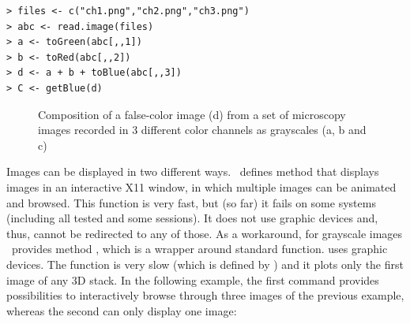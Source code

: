 \begin{verbatim}
> files <- c("ch1.png","ch2.png","ch3.png")
> abc <- read.image(files)
> a <- toGreen(abc[,,1])
> b <- toRed(abc[,,2])
> d <- a + b + toBlue(abc[,,3])
> C <- getBlue(d)
\end{verbatim}

\begin{figure}
\vspace*{.1in}
\begin{center}
\end{center}
\caption{\label{figure:channels}
    Composition of a false-color image (d) from a set of microscopy images recorded in 3 different color channels as grayscales (a, b and c)
}
\end{figure}

Images can be displayed in two different ways. \EBImage\ defines method  that displays images in an interactive X11 window, in which multiple images can be animated and browsed. This function is very fast, but (so far) it fails on some systems (including all tested  and some  sessions). It does not use \R{} graphic devices and, thus, cannot be redirected to any of those. As a workaround, for grayscale images \EBImage\ provides method , which is a wrapper around standard \R{}  function.  uses \R{} graphic devices. The function is very slow (which is defined by ) and it plots only the first image of any 3D stack. In the following example, the first command provides possibilities to interactively browse through three images of the previous example, whereas the second can only display one image:


